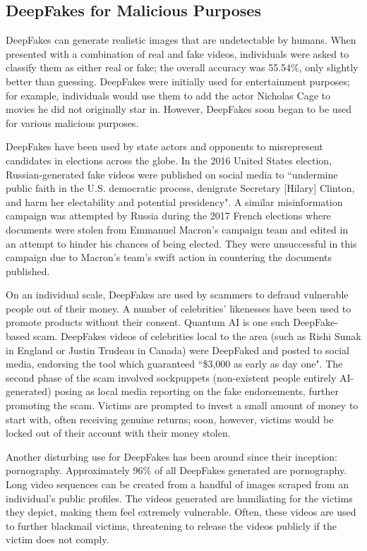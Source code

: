 \subsection{DeepFakes for Malicious Purposes}
\label{sec:mal-deepfakes}

DeepFakes can generate realistic images that are undetectable by humans. When presented with a combination of real and fake videos, individuals were asked to classify them as either real or fake; the overall accuracy was 55.54\%\cite{diel2024human}, only slightly better than guessing. DeepFakes were initially used for entertainment purposes; for example, individuals would use them to add the actor Nicholas Cage to movies he did not originally star in\cite{harris2023deep}. However, DeepFakes soon began to be used for various malicious purposes.

DeepFakes have been used by state actors and opponents to misrepresent candidates in elections across the globe. In the 2016 United States election, Russian-generated fake videos were published on social media to ``undermine public faith in the U.S. democratic process, denigrate Secretary [Hilary] Clinton, and harm her electability and potential presidency"\cite{harris2023deep}. A similar misinformation campaign was attempted by Russia during the 2017 French elections where documents were stolen from Emmanuel Macron's campaign team and edited in an attempt to hinder his chances of being elected\cite{chesney2019deep}. They were unsuccessful in this campaign due to Macron's team's swift action in countering the documents published. 

On an individual scale, DeepFakes are used by scammers to defraud vulnerable people out of their money. A number of celebrities' likenesses have been used to promote products without their consent. Quantum AI is one such DeepFake-based scam\cite{sensity2024state}. DeepFakes videos of celebrities local to the area (such as Rishi Sunak in England or Justin Trudeau in Canada) were DeepFaked and posted to social media, endorsing the tool which guaranteed ``\$3,000 as early as day one". The second phase of the scam involved sockpuppets (non-existent people entirely AI-generated) posing as local media reporting on the fake endorsements, further promoting the scam. Victims are prompted to invest a small amount of money to start with, often receiving genuine returns; soon, however, victims would be locked out of their account with their money stolen.

Another disturbing use for DeepFakes has been around since their inception: pornography. Approximately 96\% of all DeepFakes generated are pornography\cite{ajder2019state}. Long video sequences can be created from a handful of images scraped from an individual's public profiles\cite{chesney2019deep}. The videos generated are humiliating for the victims they depict, making them feel extremely vulnerable. Often, these videos are used to further blackmail victims, threatening to release the videos publicly if the victim does not comply.

